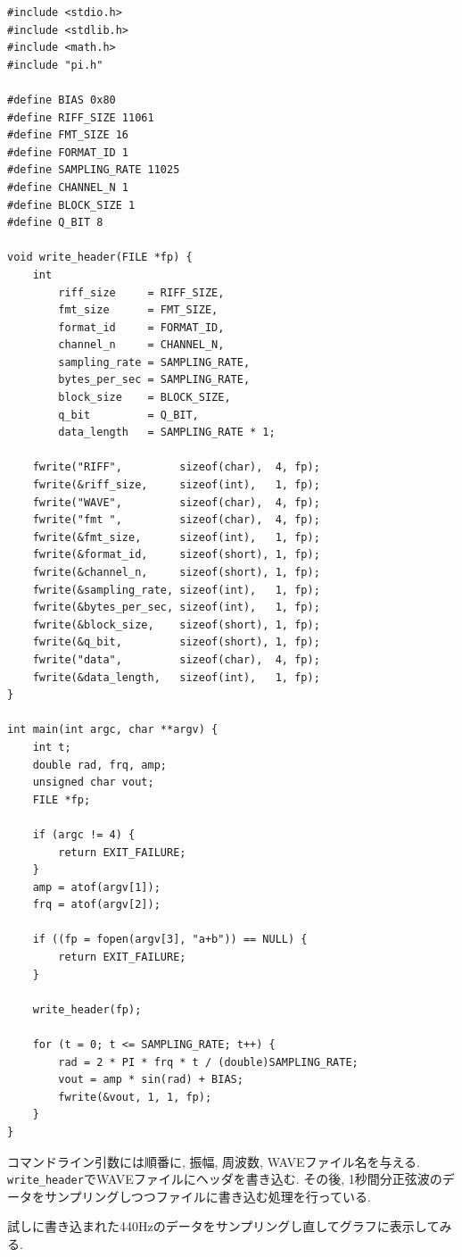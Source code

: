 \documentclass[titlepage]{jsarticle}
\begin{document}
        \begin{lstlisting}[caption=rec-m8.c, label=src:rec]
#include <stdio.h>
#include <stdlib.h>
#include <math.h>
#include "pi.h"

#define BIAS 0x80
#define RIFF_SIZE 11061
#define FMT_SIZE 16
#define FORMAT_ID 1
#define SAMPLING_RATE 11025
#define CHANNEL_N 1
#define BLOCK_SIZE 1
#define Q_BIT 8

void write_header(FILE *fp) {
    int
        riff_size     = RIFF_SIZE,
        fmt_size      = FMT_SIZE,
        format_id     = FORMAT_ID,
        channel_n     = CHANNEL_N,
        sampling_rate = SAMPLING_RATE,
        bytes_per_sec = SAMPLING_RATE,
        block_size    = BLOCK_SIZE,
        q_bit         = Q_BIT,
        data_length   = SAMPLING_RATE * 1;

    fwrite("RIFF",         sizeof(char),  4, fp);
    fwrite(&riff_size,     sizeof(int),   1, fp);
    fwrite("WAVE",         sizeof(char),  4, fp);
    fwrite("fmt ",         sizeof(char),  4, fp);
    fwrite(&fmt_size,      sizeof(int),   1, fp);
    fwrite(&format_id,     sizeof(short), 1, fp);
    fwrite(&channel_n,     sizeof(short), 1, fp);
    fwrite(&sampling_rate, sizeof(int),   1, fp);
    fwrite(&bytes_per_sec, sizeof(int),   1, fp);
    fwrite(&block_size,    sizeof(short), 1, fp);
    fwrite(&q_bit,         sizeof(short), 1, fp);
    fwrite("data",         sizeof(char),  4, fp);
    fwrite(&data_length,   sizeof(int),   1, fp);
}

int main(int argc, char **argv) {
    int t;
    double rad, frq, amp;
    unsigned char vout;
    FILE *fp;

    if (argc != 4) {
        return EXIT_FAILURE;
    }
    amp = atof(argv[1]);
    frq = atof(argv[2]);

    if ((fp = fopen(argv[3], "a+b")) == NULL) {
        return EXIT_FAILURE;
    }

    write_header(fp);

    for (t = 0; t <= SAMPLING_RATE; t++) {
        rad = 2 * PI * frq * t / (double)SAMPLING_RATE;
        vout = amp * sin(rad) + BIAS;
        fwrite(&vout, 1, 1, fp);
    }
}\end{lstlisting}

            コマンドライン引数には順番に, 振幅, 周波数, WAVEファイル名を与える.
            \verb|write_header|でWAVEファイルにヘッダを書き込む.
            その後, 1秒間分正弦波のデータをサンプリングしつつファイルに書き込む処理を行っている.

            試しに書き込まれた440Hzのデータをサンプリングし直してグラフに表示してみる.
\end{document}
